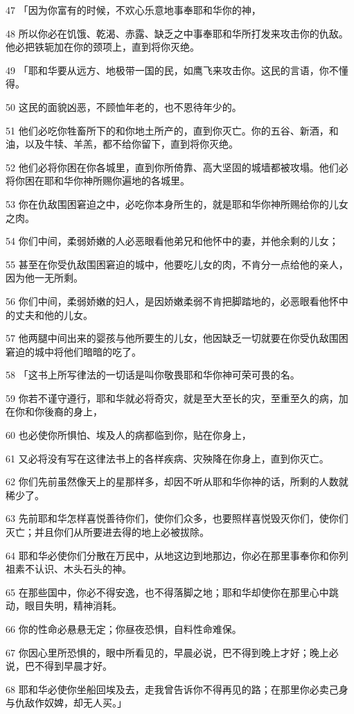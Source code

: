 \par 47 「因为你富有的时候，不欢心乐意地事奉耶和华你的神，
\par 48 所以你必在饥饿、乾渴、赤露、缺乏之中事奉耶和华所打发来攻击你的仇敌。他必把铁轭加在你的颈项上，直到将你灭绝。
\par 49 「耶和华要从远方、地极带一国的民，如鹰飞来攻击你。这民的言语，你不懂得。
\par 50 这民的面貌凶恶，不顾恤年老的，也不恩待年少的。
\par 51 他们必吃你牲畜所下的和你地土所产的，直到你灭亡。你的五谷、新酒，和油，以及牛犊、羊羔，都不给你留下，直到将你灭绝。
\par 52 他们必将你困在你各城里，直到你所倚靠、高大坚固的城墙都被攻塌。他们必将你困在耶和华你神所赐你遍地的各城里。
\par 53 你在仇敌围困窘迫之中，必吃你本身所生的，就是耶和华你神所赐给你的儿女之肉。
\par 54 你们中间，柔弱娇嫩的人必恶眼看他弟兄和他怀中的妻，并他余剩的儿女；
\par 55 甚至在你受仇敌围困窘迫的城中，他要吃儿女的肉，不肯分一点给他的亲人，因为他一无所剩。
\par 56 你们中间，柔弱娇嫩的妇人，是因娇嫩柔弱不肯把脚踏地的，必恶眼看他怀中的丈夫和他的儿女。
\par 57 他两腿中间出来的婴孩与他所要生的儿女，他因缺乏一切就要在你受仇敌围困窘迫的城中将他们暗暗的吃了。
\par 58 「这书上所写律法的一切话是叫你敬畏耶和华你神可荣可畏的名。
\par 59 你若不谨守遵行，耶和华就必将奇灾，就是至大至长的灾，至重至久的病，加在你和你後裔的身上，
\par 60 也必使你所惧怕、埃及人的病都临到你，贴在你身上，
\par 61 又必将没有写在这律法书上的各样疾病、灾殃降在你身上，直到你灭亡。
\par 62 你们先前虽然像天上的星那样多，却因不听从耶和华你神的话，所剩的人数就稀少了。
\par 63 先前耶和华怎样喜悦善待你们，使你们众多，也要照样喜悦毁灭你们，使你们灭亡；并且你们从所要进去得的地上必被拔除。
\par 64 耶和华必使你们分散在万民中，从地这边到地那边，你必在那里事奉你和你列祖素不认识、木头石头的神。
\par 65 在那些国中，你必不得安逸，也不得落脚之地；耶和华却使你在那里心中跳动，眼目失明，精神消耗。
\par 66 你的性命必悬悬无定；你昼夜恐惧，自料性命难保。
\par 67 你因心里所恐惧的，眼中所看见的，早晨必说，巴不得到晚上才好；晚上必说，巴不得到早晨才好。
\par 68 耶和华必使你坐船回埃及去，走我曾告诉你不得再见的路；在那里你必卖己身与仇敌作奴婢，却无人买。」

